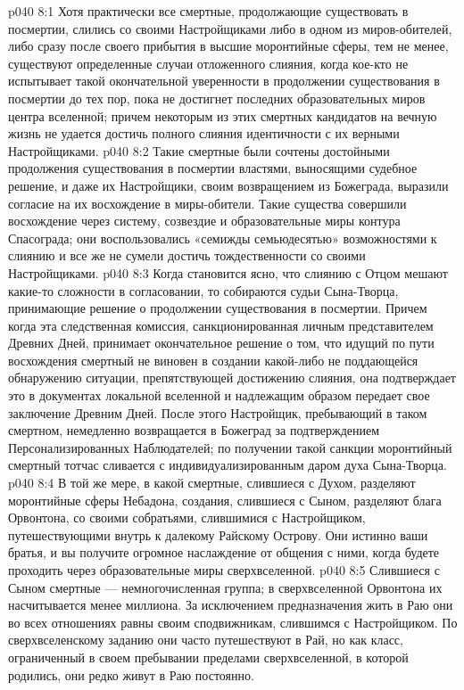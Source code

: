 \vs p040 8:1 Хотя практически все смертные, продолжающие существовать в посмертии, слились со своими Настройщиками либо в одном из миров\hyp{}обителей, либо сразу после своего прибытия в высшие моронтийные сферы, тем не менее, существуют определенные случаи отложенного слияния, когда кое\hyp{}кто не испытывает такой окончательной уверенности в продолжении существования в посмертии до тех пор, пока не достигнет последних образовательных миров центра вселенной; причем некоторым из этих смертных кандидатов на вечную жизнь не удается достичь полного слияния идентичности с их верными Настройщиками.
\vs p040 8:2 Такие смертные были сочтены достойными продолжения существования в посмертии властями, выносящими судебное решение, и даже их Настройщики, своим возвращением из Божеграда, выразили согласие на их восхождение в миры\hyp{}обители. Такие существа совершили восхождение через систему, созвездие и образовательные миры контура Спасограда; они воспользовались «семижды семьюдесятью» возможностями к слиянию и все же не сумели достичь тождественности со своими Настройщиками.
\vs p040 8:3 Когда становится ясно, что слиянию с Отцом мешают какие\hyp{}то сложности в согласовании, то собираются судьи Сына\hyp{}Творца, принимающие решение о продолжении существования в посмертии. Причем когда эта следственная комиссия, санкционированная личным представителем Древних Дней, принимает окончательное решение о том, что идущий по пути восхождения смертный не виновен в создании какой\hyp{}либо не поддающейся обнаружению ситуации, препятствующей достижению слияния, она подтверждает это в документах локальной вселенной и надлежащим образом передает свое заключение Древним Дней. После этого Настройщик, пребывающий в таком смертном, немедленно возвращается в Божеград за подтверждением Персонализированных Наблюдателей; по получении такой санкции моронтийный смертный тотчас сливается с индивидуализированным даром духа Сына\hyp{}Творца.
\vs p040 8:4 \pc В той же мере, в какой смертные, слившиеся с Духом, разделяют моронтийные сферы Небадона, создания, слившиеся с Сыном, разделяют блага Орвонтона, со своими собратьями, слившимися с Настройщиком, путешествующими внутрь к далекому Райскому Острову. Они истинно ваши братья, и вы получите огромное наслаждение от общения с ними, когда будете проходить через образовательные миры сверхвселенной.
\vs p040 8:5 Слившиеся с Сыном смертные --- немногочисленная группа; в сверхвселенной Орвонтона их насчитывается менее миллиона. За исключением предназначения жить в Раю они во всех отношениях равны своим сподвижникам, слившимся с Настройщиком. По сверхвселенскому заданию они часто путешествуют в Рай, но как класс, ограниченный в своем пребывании пределами сверхвселенной, в которой родились, они редко живут в Раю постоянно.
